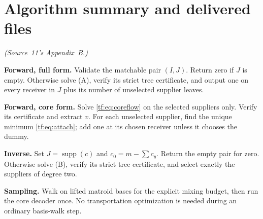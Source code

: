 \documentclass[11pt]{article}
\numberwithin{equation}{section}
\theoremstyle{definition}
\newcommand{\supp}{\operatorname{supp}}
\begin{document}
\section{Algorithm summary and delivered files}
\label{tf:app:algorithms}
\noindent\emph{(Source~11's Appendix~B.)}
\begin{statusbox}
\textbf{Forward, full form.} Validate the matchable pair $(I,J)$. Return
zero if $J$ is empty. Otherwise solve (A), verify its strict tree
certificate, and output one on every receiver in $J$ plus its number of
unselected supplier leaves.

\medskip
\textbf{Forward, core form.} Solve \eqref{tf:eq:coreflow} on the selected
suppliers only. Verify its certificate and extract $v$. For each
unselected supplier, find the unique minimum \eqref{tf:eq:attach}; add one
at its chosen receiver unless it chooses the dummy.

\medskip
\textbf{Inverse.} Set $J=\supp(c)$ and $c_0=m-\sum c_y$. Return the empty
pair for zero. Otherwise solve (B), verify its strict tree certificate,
and select exactly the suppliers of degree two.

\medskip
\textbf{Sampling.} Walk on lifted matroid bases for the explicit mixing
budget, then run the core decoder once. No transportation optimization is
needed during an ordinary basis-walk step.
\end{statusbox}
\end{document}
